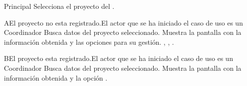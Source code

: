 	\begin{UCtrayectoria}{Principal}
		\UCpaso[\UCactor] Selecciona el proyecto del .    

	\end{UCtrayectoria}
	\begin{UCtrayectoriaA}{A}{El proyecto no esta registrado.}{El actor que se ha iniciado el caso de uso es un Coordinador}
		\UCpaso Busca datos del proyecto seleccionado.
	 	\UCpaso Muestra la pantalla  con la información obtenida y las opciones para su gestión. , , .
	\end{UCtrayectoriaA}
	
	\begin{UCtrayectoriaA}{B}{El proyecto esta registrado.}{El actor que se ha iniciado el caso de uso es un Coordinador}
		\UCpaso Busca datos del proyecto seleccionado.
	 	\UCpaso Muestra la pantalla  con la información obtenida y la opción  .
	\end{UCtrayectoriaA}

